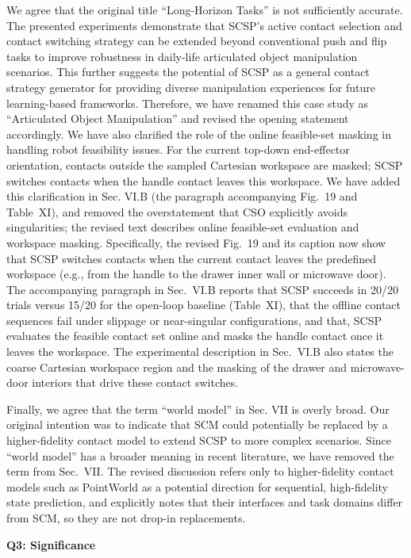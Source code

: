 \documentclass[journal,10pt]{IEEEtran}
\newcommand{\question}[2]{\par\smallskip\noindent
 \color{responseblue}\textbf{Q#1: #2}\par\nobreak\noindent\color{responseblue}}
\begin{document}
We agree that the original title ``Long-Horizon Tasks'' is not sufficiently
accurate. The presented experiments demonstrate that SCSP's active contact
selection and contact switching strategy can be extended beyond conventional
push and flip tasks to improve robustness in daily-life articulated object
manipulation scenarios. This further suggests the potential of SCSP as a
general contact strategy generator for providing diverse manipulation
experiences for future learning-based frameworks.
Therefore, we have renamed this case study as ``Articulated Object
Manipulation'' and revised the opening statement accordingly. We have also clarified the role of the
online feasible-set masking in handling robot feasibility issues. For the current top-down end-effector orientation, contacts outside the sampled Cartesian workspace are masked; SCSP switches contacts when the handle contact leaves this workspace. We have added
this clarification in Sec. VI.B (the paragraph accompanying Fig.~19 and Table~XI), and removed the overstatement
that CSO explicitly avoids singularities; the revised text describes online feasible-set evaluation and workspace masking.
Specifically, the revised Fig.~19 and its caption now show that SCSP switches contacts when the current contact leaves the predefined workspace (e.g., from the handle to the drawer inner wall or microwave door). The accompanying paragraph in Sec.~VI.B reports that SCSP succeeds in 20/20 trials versus 15/20 for the open-loop baseline (Table~XI), that the offline contact sequences fail under slippage or near-singular configurations, and that, SCSP evaluates the feasible contact set online and masks the handle contact once it leaves the workspace. The experimental description in Sec.~VI.B also states the coarse Cartesian workspace region and the masking of the drawer and microwave-door interiors that drive these contact switches.

Finally, we agree that the term ``world model'' in Sec. VII is overly broad.
Our original intention was to indicate that SCM could potentially be replaced
by a higher-fidelity contact model to extend SCSP to more complex scenarios. Since
``world model'' has a broader meaning in recent literature, we have removed the term from Sec.~VII. The revised discussion refers only to higher-fidelity contact models such as PointWorld as a potential direction for sequential, high-fidelity state prediction, and explicitly notes that their interfaces and task domains differ from SCM, so they are not drop-in replacements.

\question{3}{Significance}
\end{document}

